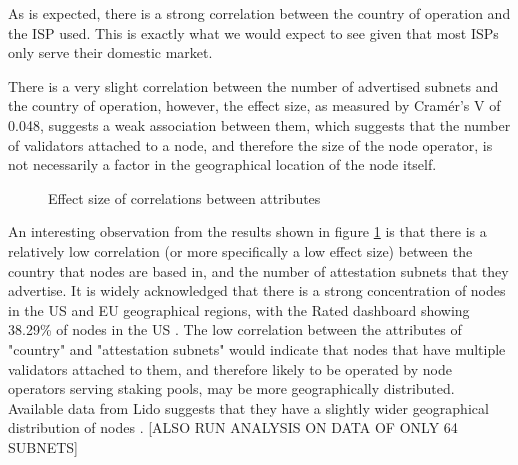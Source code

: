 \documentclass[conference]{IEEEtran}
\begin{document}
As is expected, there is a strong correlation between the country of operation and the ISP used.  This is exactly what we would expect to see given that most ISPs only serve their domestic market.

There is a very slight correlation between the number of advertised subnets and the country of operation, however, the effect size, as measured by Cramér's V of 0.048, suggests a weak association between them, which suggests that the number of validators attached to a node, and therefore the size of the node operator, is not necessarily a factor in the geographical location of the node itself.

\begin{figure}[htbp]
    \centering
    \caption{Effect size of correlations between attributes}
    \label{fig:relative-level-of-correlation-between-attributes}
\end{figure}

An interesting observation from the results shown in figure \ref{fig:relative-level-of-correlation-between-attributes} is that there is a relatively low correlation (or more specifically a low effect size) between the country that nodes are based in, and the number of attestation subnets that they advertise.  It is widely acknowledged that there is a strong concentration of nodes in the US and EU geographical regions, with the Rated dashboard showing 38.29\% of nodes in the US \cite{ratednetwork2024}.  The low correlation between the attributes of "country" and "attestation subnets" would indicate that nodes that have multiple validators attached to them, and therefore likely to be operated by node operators serving staking pools, may be more geographically distributed.  Available data from Lido suggests that they have a slightly wider geographical distribution of nodes \cite{lido2024}. [ALSO RUN ANALYSIS ON DATA OF ONLY 64 SUBNETS]
\end{document}
